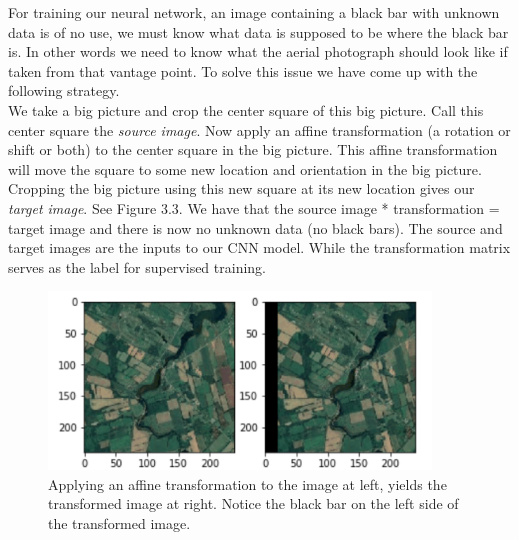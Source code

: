 For training our neural network, an image containing a black bar with unknown data is of no use, we must know what data is supposed to be where the black bar is. In other words we need to know what the aerial photograph should look like if taken from that vantage point. To solve this issue we have come up with the following strategy.\\
  We take a big picture and crop the center square of this big picture. Call this center square the \textit{source image}. Now apply an affine transformation (a rotation or shift or both) to the center square in the big picture. This affine transformation will move the square to some new location and orientation in the big picture. Cropping the big picture using this new square at its new location gives our \textit{target image}. See Figure 3.3. We have that the source image * transformation = target image and there is now no unknown data (no black bars). The source and target images are the inputs to our CNN model. While the transformation matrix serves as the label for supervised training.
\begin{figure}
 \centering
    \includegraphics[width=4.0in]{figs/affine_noise}
    \caption{Applying an affine transformation to the image at left, yields the transformed image at right. Notice the black bar on the left side of the transformed image.}
\end{figure}

